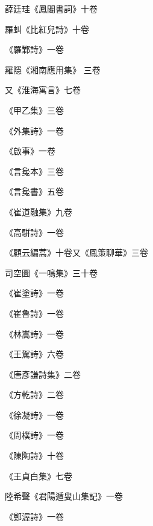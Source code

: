 \begin{pinyinscope}
 薛廷珪《鳳閣書詞》十卷



 羅虯《比紅兒詩》十卷



 《羅鄴詩》一卷



 羅隱《湘南應用集》
 三卷



 又《淮海寓言》七卷



 《甲乙集》三卷



 《外集詩》一卷



 《啟事》一卷



 《言毚本》三卷



 《言毚書》五卷



 《崔道融集》九卷



 《高駢詩》一卷



 《顧云編蒿》十卷又《鳳策聊華》三卷



 司空圖《一鳴集》三十卷



 《崔塗詩》一卷



 《崔魯詩》一卷



 《林嵩詩》一卷



 《王駕詩》六卷



 《唐彥謙詩集》二卷



 《方乾詩》二卷



 《徐凝詩》一卷



 《周樸詩》一卷



 《陳陶詩》十卷



 《王貞白集》七卷



 陸希聲《君陽遁叟山集記》一卷



 《鄭渥詩》一卷




\end{pinyinscope}
